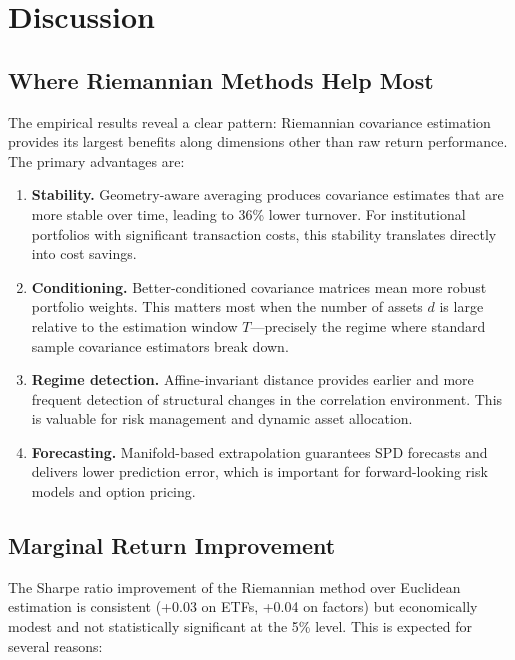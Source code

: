 \documentclass[12pt,a4paper]{article}
\begin{document}
\section{Discussion}\label{sec:discussion}

\subsection{Where Riemannian Methods Help Most}

The empirical results reveal a clear pattern: Riemannian covariance estimation
provides its largest benefits along dimensions other than raw return performance.
The primary advantages are:

\begin{enumerate}[label=(\roman*)]
    \item \textbf{Stability.} Geometry-aware averaging produces covariance
    estimates that are more stable over time, leading to 36\% lower turnover.
    For institutional portfolios with significant transaction costs, this
    stability translates directly into cost savings.

    \item \textbf{Conditioning.} Better-conditioned covariance matrices mean
    more robust portfolio weights. This matters most when the number of assets
    $d$ is large relative to the estimation window $T$---precisely the regime
    where standard sample covariance estimators break down.

    \item \textbf{Regime detection.} Affine-invariant distance provides
    earlier and more frequent detection of structural changes in the
    correlation environment. This is valuable for risk management and dynamic
    asset allocation.

    \item \textbf{Forecasting.} Manifold-based extrapolation guarantees SPD
    forecasts and delivers lower prediction error, which is important for
    forward-looking risk models and option pricing.
\end{enumerate}

\subsection{Marginal Return Improvement}

The Sharpe ratio improvement of the Riemannian method over Euclidean
estimation is consistent (+0.03 on ETFs, +0.04 on factors) but economically
modest and not statistically significant at the 5\% level. This is expected
for several reasons:
\end{document}
